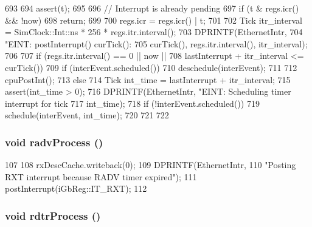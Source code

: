\begin{DoxyCode}
693 {
694     assert(t);
695 
696     // Interrupt is already pending
697     if (t & regs.icr() && !now)
698         return;
699 
700     regs.icr = regs.icr() | t;
701 
702     Tick itr_interval = SimClock::Int::ns * 256 * regs.itr.interval();
703     DPRINTF(EthernetIntr,
704             "EINT: postInterrupt() curTick(): %
705             curTick(), regs.itr.interval(), itr_interval);
706 
707     if (regs.itr.interval() == 0 || now ||
708         lastInterrupt + itr_interval <= curTick()) {
709         if (interEvent.scheduled()) {
710             deschedule(interEvent);
711         }
712         cpuPostInt();
713     } else {
714         Tick int_time = lastInterrupt + itr_interval;
715         assert(int_time > 0);
716         DPRINTF(EthernetIntr, "EINT: Scheduling timer interrupt for tick %
717                 int_time);
718         if (!interEvent.scheduled()) {
719             schedule(interEvent, int_time);
720         }
721     }
722 }
\end{DoxyCode}
\hypertarget{classIGbE_a1d54e26efe0f0a1fbd354ccffa34459f}{
\subsubsection[{radvProcess}]{\setlength{\rightskip}{0pt plus 5cm}void radvProcess ()}}
\label{classIGbE_a1d54e26efe0f0a1fbd354ccffa34459f}



\begin{DoxyCode}
107                        {
108         rxDescCache.writeback(0);
109         DPRINTF(EthernetIntr,
110                 "Posting RXT interrupt because RADV timer expired\n");
111         postInterrupt(iGbReg::IT_RXT);
112     }
\end{DoxyCode}
\hypertarget{classIGbE_a047d922eba10484b3a0127faa8e1be0a}{
\subsubsection[{rdtrProcess}]{\setlength{\rightskip}{0pt plus 5cm}void rdtrProcess ()}}
\label{classIGbE_a047d922eba10484b3a0127faa8e1be0a}



